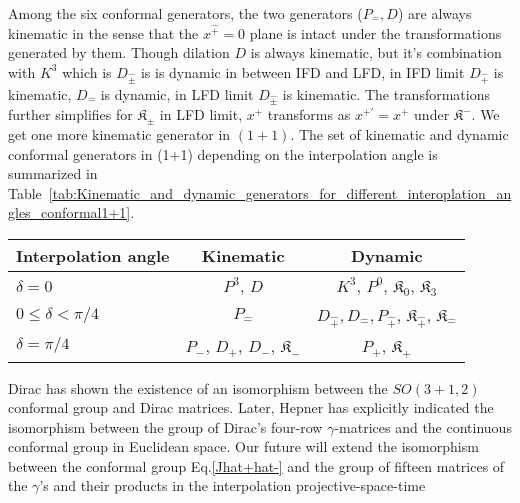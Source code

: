 \documentclass[%
 reprint,
superscriptaddress,
 amsmath,amssymb,
 aps,
]{revtex4-2}
\newcommand{\pT}{\hat{+}}
\newcommand{\mT}{\hat{-}}
\begin{document}
Among the six conformal generators, the two generators ($P_{\mT}, D$) are always kinematic in the sense that the $x^{\pT}=0$ plane is intact under the transformations generated by them. Though dilation $D$ is always kinematic, but it's combination with $K^3$ which is $D_{\hat{\pm}}$ is is dynamic in between IFD and LFD, in IFD limit $D_{\hat{+}}$ is kinematic, $D_{\hat{-}}$ is dynamic, in LFD limit $D_{\hat{\pm}}$ is kinematic. The transformations further simplifies for $\mathfrak{K}_{\pm}$ in LFD limit, $x^{+}$ transforms as $ x^{+\prime} =x^{+}$ under $\mathfrak{K}^{-}$. We get one more kinematic generator in $(1+1)$. The set of kinematic and dynamic conformal generators in (1+1) depending on the interpolation angle is summarized in Table~\ref {tab:Kinematic_and_dynamic_generators_for_different_interoplation_angles_conformal1+1}. 

\begin{widetext}
    \begin{center}
        \begin{table*}[h!]
  \caption{\label{tab:Kinematic_and_dynamic_generators_for_different_interoplation_angles_conformal1+1}Kinematic and dynamic conformal generators for different interpolation angles in $(1+1)$}
    \begin{ruledtabular}
       \begin{tabular}{lcc}
	Interpolation angle & Kinematic & Dynamic \\
	\hline
	\rule{0pt}{3ex} $\delta=0$ & $P^{3}$, $D$ & $ K^{3}$, $P^{0}$, $\mathfrak{K}_{{0}}$, $\mathfrak{K}_{{3}}$\\
	$0\leq\delta<\pi/4$ &  $P_{\mT}$ & $D_{\hat{+}}, D_{\hat{-}}, P_{\pT}$, $\mathfrak{K}_{\hat{+}}$, $\mathfrak{K}_{\hat{-}}$\\
	$\delta=\pi/4$ & $P_{-}$, $D_{+}$, $D_{-}$, $\mathfrak{K}_{{-}}$& $P_{+}$, $\mathfrak{K}_{{+}}$\\
      \end{tabular}
    \end{ruledtabular}
\end{table*}
    \end{center}
\end{widetext}

Dirac\cite{Dirac1936} has shown the existence of an isomorphism between the $SO(3+1,2)$ conformal group and Dirac matrices. Later, Hepner\cite{Hepner1962} has explicitly indicated the isomorphism between the group of Dirac's four-row $\gamma$-matrices and the continuous conformal group in Euclidean space. Our future will extend the isomorphism between the conformal group Eq.\eqref{Jhat+hat-} and the group of fifteen matrices of the $\gamma$'s and their products in the interpolation projective-space-time
\end{document}
